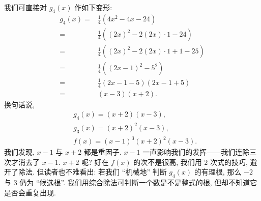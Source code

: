 \begin{example}
\begin{align*}
    \end{align*}
    我们可直接对 $g_4 (x)$ 作如下变形:
    \begin{align*}
        g_4 (x)
        = {} & \frac{1}{4} (4x^2 - 4x - 24)                   \\
        = {} & \frac{1}{4} ((2x)^2 - 2 (2x) \cdot 1 - 24)     \\
        = {} & \frac{1}{4} ((2x)^2 - 2 (2x) \cdot 1 + 1 - 25) \\
        = {} & \frac{1}{4} ((2x - 1)^2 - 5^2)                 \\
        = {} & \frac{1}{4} (2x - 1 - 5) (2x - 1 + 5)          \\
        = {} & (x - 3) (x + 2).
    \end{align*}
    换句话说,
    \begin{align*}
         & g_4 (x) = (x + 2) (x - 3),          \\
         & g_3 (x) = (x + 2)^2 (x - 3),        \\
         & f(x) = (x - 1)^3 (x + 2)^2 (x - 3).
    \end{align*}
    我们发现, $x-1$ 与 $x+2$ 都是重因子. $x-1$ 一直影响我们的发挥——我们连除三次才消去了 $x-1$. $x+2$ 呢? 好在 $f(x)$ 的次不是很高, 我们用 $2$ 次式的技巧, 避开了除法. 但读者也不难看出: 若我们 ``机械地'' 判断 $g_4 (x)$ 的有理根, 那么 $-2$ 与 $3$ 仍为 ``候选根''. 我们用综合除法可判断一个数是不是整式的根, 但却不知道它是否会重复出现.
\end{example}

